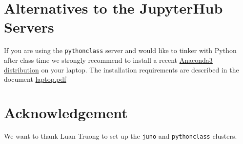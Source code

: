 \documentclass[11pt]{article}
\begin{document}
\section{Alternatives to the JupyterHub Servers}
If you are using the \texttt{pythonclass} server and would like to tinker with Python after class time 
we strongly recommend to install 
a recent \href{https://www.anaconda.com/download/}{Anaconda3 distribution} on your laptop.
The installation requirements are described in the document 
\href{https://github.com/CHPC-UofU/python-lectures/tree/master/docs/laptop.pdf}{laptop.pdf}

\section*{Acknowledgement}
We want to thank Luan Truong to set up the \texttt{juno} and \texttt{pythonclass} clusters. 

%
%
\end{document}
